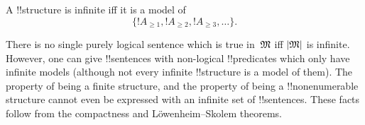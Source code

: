 \documentclass[../../../include/open-logic-section]{subfiles}
\begin{document}
\begin{prop}
A !!{structure} is infinite iff it is a model of
\[
\{!A_{\ge 1}, !A_{\ge 2}, !A_{\ge 3}, \dots \}.
\]
\end{prop}

There is no single purely logical sentence which is true in~$\Struct
M$ iff $\Domain M$ is infinite.  However, one can give !!{sentence}s with
non-logical !!{predicate}s which only have infinite models (although
not every infinite !!{structure} is a model of them).  The property of
being a finite structure, and the property of being a
!!{nonenumerable} structure cannot even be expressed with an infinite
set of !!{sentence}s.  These facts follow from the compactness and
L\"owenheim--Skolem theorems.
\end{document}

